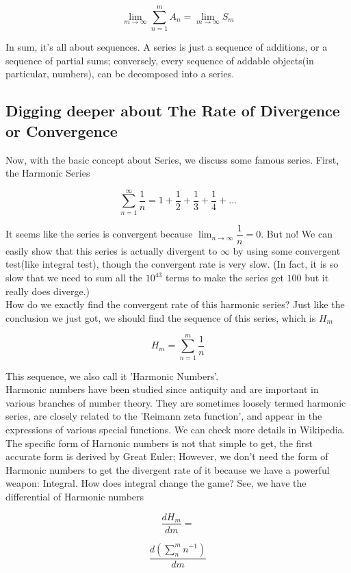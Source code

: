 \documentclass{article}
\begin{document}
  \[
	  \lim_{m \to \infty} \sum_{n=1}^{m} A_n = \lim_{m \to \infty} S_m
  \]

  In sum, it's all about sequences. A series is just a sequence of additions, or a sequence of partial sums; conversely, every sequence of addable objects(in particular, numbers), can be decomposed into a series.

  \subsection{Digging deeper about The Rate of Divergence or Convergence}
  Now, with the basic concept about Series, we discuss some famous series. First, the Harmonic Series

  \[
	  \sum_{n=1}^{\infty} \dfrac{1}{n} = 1 + \dfrac{1}{2} + \dfrac{1}{3} + \dfrac{1}{4} + ...
  \]

  It seems like the series is convergent because $\displaystyle \lim_{n \to \infty} \dfrac{1}{n} = 0$. But no! We can easily show that this series is actually divergent to $\infty$ by using some convergent test(like integral test), though the convergent rate is very slow. (In fact, it is so slow that we need to sum all the $10^{43}$ terms to make the series get $100$ but it really does diverge.) \\

  How do we exactly find the convergent rate of this harmonic series? Just like the conclusion we just got, we should find the sequence of this series, which is $H_m$ 

  \[
	  H_m = \sum_{n=1}^{m} \dfrac{1}{n}
  \]

  This sequence, we also call it 'Harmonic Numbers'. \\

  Harmonic numbers have been studied since antiquity and are important in various branches of number theory. They are sometimes loosely termed harmonic series, are closely related to the 'Reimann zeta function', and appear in the expressions of various special functions. We can check more details in Wikipedia. The specific form of Harnonic numbers is not that simple to get, the first accurate form is derived by Great Euler; However, we don't need the form of Harmonic numbers to get the divergent rate of it because we have a powerful weapon: Integral. How does integral change the game? See, we have the differential of Harmonic numbers

  \[
	  \dfrac{dH_m}{dm} =
  \]

  \[
	  \dfrac{d \left( \displaystyle \sum_{n}^{m} n^{-1} \right)}{dm}
  \]
\end{document}
